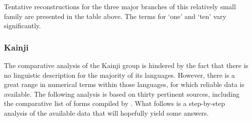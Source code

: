Tentative reconstructions for the three major branches of this relatively small family are presented in the table above. The terms for ‘one’ and ‘ten’ vary significantly.

\clearpage
\subsubsection{Kainji}\label{sec:3.1.2.7}
The comparative analysis of the Kainji group is hindered by the fact that there is no linguistic description for the majority of its languages. However, there is a great range in numerical terms within those languages, for which reliable data is available. The following analysis is based on thirty pertinent sources, including the comparative list of forms compiled by \citet{Dettweiler1993}. What follows is a step-by-step analysis of the available data that will hopefully yield some answers.   

\label{sec:3.1.2.7.1}

